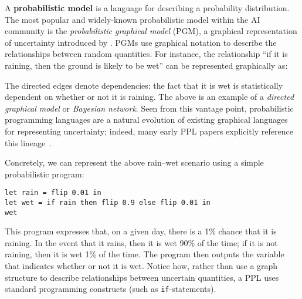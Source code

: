 \documentclass{tufte-handout}
\newcommand{\defn}[1]{\textbf{#1}}
\begin{document}
A \defn{probabilistic model} is a language for describing a probability distribution.
The most popular and widely-known probabilistic model within the AI community is
the \emph{probabilistic graphical model} (PGM), a graphical representation of
uncertainty introduced by \citet{pearl1988probabilistic}. PGMs use 
graphical notation to describe the relationships between random quantities. 
For instance, the relationship ``if it is raining, then the ground is likely 
to be wet'' can be represented graphically as:
\begin{center}
\end{center}

The directed edges denote dependencies: the fact that it is wet is statistically 
dependent on whether or not it is raining. The above is an example of a \emph{directed 
graphical model} or \emph{Bayesian network}.
Seen from this vantage point, probabilistic programming languages are a natural
evolution of existing graphical languages for representing uncertainty; indeed,
many early PPL papers explicitly reference this
lineage~\citep{sato1997prism,ramsey2002stochastic,goodman2012church}.


Concretely, we can represent the above rain--wet scenario using a simple
probabilistic program:

\begin{lstlisting}
let rain = flip 0.01 in
let wet = if rain then flip 0.9 else flip 0.01 in
wet
\end{lstlisting}

This program expresses that, on a given day, there is a 1\% chance that it is 
raining. In the event that it rains, then it is wet 90\% of the time; 
if it is not raining, then it is wet 1\% of the time. The program then outputs 
the variable that indicates whether or not it is wet. Notice how, rather than 
use a graph structure to describe relationships between uncertain quantities, 
a PPL uses standard programming constructs (such as \texttt{if}-statements).
\end{document}
